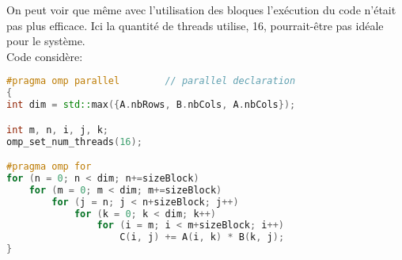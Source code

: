 \documentclass{article}
\begin{document}
\begin{resolution}
    \begin{center}
        \begin{minipage}[b]{0.3\textwidth}
        \end{minipage}
        \begin{minipage}[b]{0.3\textwidth}
        \end{minipage}
        \begin{minipage}[b]{0.3\textwidth}
        \end{minipage}
    \end{center}

    On peut voir que même avec l'utilisation des bloques l'exécution du code n'était pas plus efficace. Ici la quantité de threads utilise, 16, pourrait-être pas idéale pour le système.\\

    Code considère:
    \begin{scriptsize}
        \mycode
        \begin{lstlisting}[language=C++]
#pragma omp parallel        // parallel declaration
{
int dim = std::max({A.nbRows, B.nbCols, A.nbCols});

int m, n, i, j, k;
omp_set_num_threads(16);

#pragma omp for
for (n = 0; n < dim; n+=sizeBlock)
    for (m = 0; m < dim; m+=sizeBlock)
        for (j = n; j < n+sizeBlock; j++)
            for (k = 0; k < dim; k++)
                for (i = m; i < m+sizeBlock; i++)
                    C(i, j) += A(i, k) * B(k, j);
}
        \end{lstlisting}
    \end{scriptsize}
\end{resolution}
\end{document}
